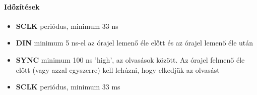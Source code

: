 \documentclass[12pt]{article}
\begin{document}
    \paragraph{Időzítések}
    \begin{itemize}
      \begin{itemize}
        \item \textbf{SCLK} periódus, minimum 33 ns
        \item \textbf{DIN} minimum 5 ns-el az órajel lemenő éle előtt és az órajel lemenő éle után
        \item \textbf{SYNC} minimum 100 ns 'high', az olvasások között. Az órajel felmenő éle előtt (vagy azzal egyszerre) kell lehúzni, hogy elkedjük az olvasást
      \end{itemize}
      
    \end{itemize}
    \begin{itemize}
      \item \textbf{SCLK} periódus, minimum 33 ms
    \end{itemize}
\end{document}
